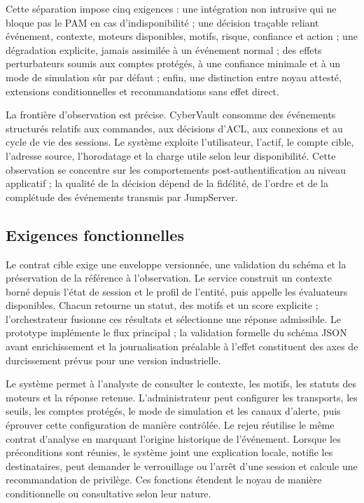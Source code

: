 \documentclass[11pt,a4paper,oneside]{report}
\theoremstyle{definition}
\theoremstyle{plain}
\begin{document}
Cette séparation impose cinq exigences : une intégration non intrusive qui ne
bloque pas le PAM en cas d'indisponibilité ; une décision traçable reliant
événement, contexte, moteurs disponibles, motifs, risque, confiance et action ;
une dégradation explicite, jamais assimilée à un événement normal ; des effets
perturbateurs soumis aux comptes protégés, à une confiance minimale et à un
mode de simulation sûr par défaut ; enfin, une distinction entre noyau attesté,
extensions conditionnelles et recommandations sans effet direct.

La frontière d'observation est précise. CyberVault consomme des événements
structurés relatifs aux commandes, aux décisions d'ACL, aux connexions et au
cycle de vie des sessions. Le système exploite l'utilisateur, l'actif, le compte
cible, l'adresse source, l'horodatage et la charge utile selon leur disponibilité.
Cette observation se concentre sur les comportements post-authentification au
niveau applicatif ; la qualité de la décision dépend de la fidélité, de l'ordre
et de la complétude des événements transmis par JumpServer.

\subsection{Exigences fonctionnelles}

Le contrat cible exige une enveloppe versionnée, une validation du schéma et
la préservation de la référence à l'observation. Le service construit un
contexte borné depuis l'état de session et le profil de l'entité, puis
appelle les évaluateurs disponibles. Chacun retourne un statut, des motifs et
un score explicite ; l'orchestrateur fusionne ces résultats et sélectionne une
réponse admissible. Le prototype implémente le flux principal ; la validation
formelle du schéma JSON avant enrichissement et la journalisation préalable à
l'effet constituent des axes de durcissement prévus pour une version
industrielle.

Le système permet à l'analyste de consulter le contexte, les motifs, les
statuts des moteurs et la réponse retenue. L'administrateur peut configurer
les transports, les seuils, les comptes protégés, le mode de simulation et les
canaux d'alerte, puis éprouver cette configuration de manière contrôlée. Le
rejeu réutilise le même contrat d'analyse en marquant l'origine historique de
l'événement. Lorsque les préconditions sont réunies, le système joint une
explication locale, notifie les destinataires, peut demander le verrouillage
ou l'arrêt d'une session et calcule une recommandation de privilège. Ces
fonctions étendent le noyau de manière conditionnelle ou consultative selon
leur nature.
\end{document}
